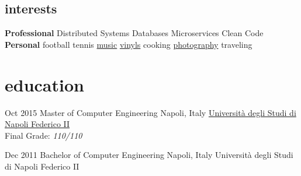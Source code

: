 \begin{aside}
\section{\normalfont interests}
\textbf{Professional}
Distributed Systems
Databases
Microservices
Clean Code
~
\vspace{-0.1cm}
\textbf{Personal}
football
tennis
\href{https://open.spotify.com/user/1171479957}{music}
\href{https://www.discogs.com/user/little_jacket/collection}{vinyls}
cooking
\href{https://www.flickr.com/photos/nicolagiacchetta}{photography}
traveling
~
\end{aside}

\vspace{-0.3cm}
\section{\normalfont education}

\begin{entrylist}
\entry
{Oct 2015}
{Master {\normalfont of Computer Engineering}}
{Napoli, Italy}
{\href{http://www.unina.it/home}{Università degli Studi di Napoli Federico II}}\\
Final Grade: \emph{110/110}
\vspace{-.2cm}

\entry
{Dec 2011}
{Bachelor {\normalfont of Computer Engineering}}
{Napoli, Italy}
{Università degli Studi di Napoli Federico II}\\

\end{entrylist}

